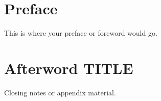 \documentclass[11pt,twoside]{book} %
\begin{document}
\frontmatter
\chapter*{Preface}
This is where your preface or foreword would go.

\tableofcontents

\mainmatter





\backmatter
\chapter*{Afterword TITLE}
Closing notes or appendix material.
\end{document}
